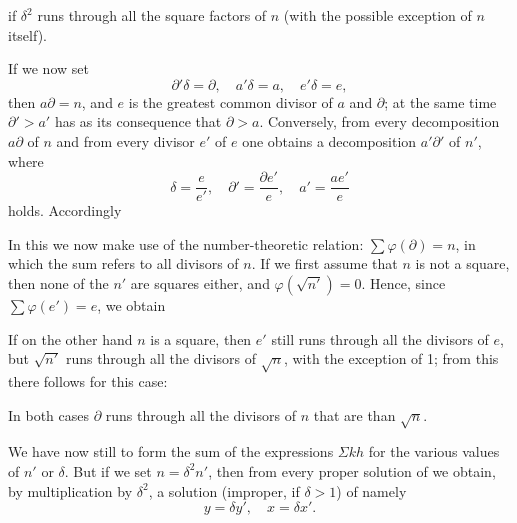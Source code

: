 if $\delta^2$ runs through all the square factors of $n$ (with the
possible exception of $n$ itself).

If we now set
\[
\partial'\delta = \partial, \quad a'\delta = a, \quad e'\delta = e,
\]
then $a\partial = n$, and $e$ is the greatest common divisor of $a$ and
$\partial$; at the same time $\partial' > a'$ has as its consequence
that $\partial > a$. Conversely, from every decomposition $a\partial$
of $n$ and from every divisor $e'$ of $e$ one obtains a decomposition
$a'\partial'$ of $n'$, where
\[
\delta = \frac{e}{e'}, \quad \partial' = \frac{\partial e'}{e}, \quad a' = \frac{a e'}{e}
\]
holds. Accordingly

In this we now make use of the number-theoretic relation:
$\sum \varphi(\partial) = n$, in which the sum refers to all divisors
of $n$. If we first assume that $n$ is not a square, then none of the
$n'$ are squares either, and $\varphi(\sqrt{n'})=0$. Hence, since
$\sum \varphi(e') = e$, we obtain

If on the other hand $n$ is a square, then $e'$ still runs through all
the divisors of $e$, but $\sqrt{n'}$ runs through all the divisors of
$\sqrt{n}$, with the exception of 1; from this there follows for this
case:

In both cases $\partial$ runs through all the divisors of $n$ that are
 than $\sqrt{n}$.

We have now still to form the sum of the expressions $\Sigma k h$ for
the various values of $n'$ or $\delta$. But if we set
$n = \delta^2 n'$, then from every proper solution of
we obtain, by multiplication by $\delta^2$, a solution (improper, if
$\delta > 1$) of
namely
\[
y = \delta y', \quad x = \delta x'.
\]
